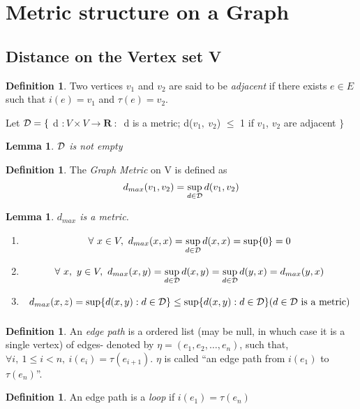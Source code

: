 \documentclass[a4paper,10pt]{book}
\newtheorem{lemma}[theorem]{Lemma}
\theoremstyle{definition}
\newtheorem{definition}[theorem]{Definition}
\theoremstyle{remark}
\numberwithin{section}{chapter}
\numberwithin{equation}{chapter}
\begin{document}
   \section{ Metric structure on a Graph}
   
   \subsection{Distance on the Vertex set V}
   \begin{definition}
      Two vertices $ v_{1}$ and $v_{2} $ are said to be \emph{adjacent} if there exists $ e \in E $ such that $ i(e) = v_1 $ and $ \tau (e) = v_2 $.
   \end{definition}
   Let $ \cal{D} = \{ $ d $: V \times V \rightarrow \mathbf{R} \ : \ $ 
 d is a metric; d($ v_1,\ v_2 $) $ \leq $ 1 if $ v_1 $, $ v_2 $ are adjacent $ \} $
   \begin{lemma}
      $ \cal{D} $ is not empty
   \end{lemma}
   \begin{definition}
      The \emph{Graph Metric} on V is defined as
      \begin{equation}
	  d_{max}(v_1,v_2)= \sup_{d \in \cal{D} }d(v_1,v_2) \nonumber
      \end{equation} 
   \end{definition}
   \begin{lemma}
	$ d_{max} $ is a metric.
    \proof 
    \begin{enumerate}
      \item \[\forall \ x \in V,\ d_{max}(x, x)= \sup_{d \in \cal{D}}d(x,x) = \sup\{ 0 \} = 0 \]
      \item \[\forall \ x,\ y \in V,\ d_{max}(x, y)= \sup_{d \in \cal{D} }d(x,y)= \sup_{d \in \cal{D} }d(y,x)  =d _{max}(y, x) \]
      \item \[ d_{max}(x, z)=\sup\{d(x,y): d \in \mathcal{D}\} \leq \sup_{}\{ d(x,y): d \in \mathcal{D}\} {( d \in \cal{D} \text{ is a metric})} \]
    \end{enumerate}    
  \end{lemma}
  \begin{definition}
   An \emph{edge path} is a ordered list (may be null, in whuch case it is a single vertex) of edges- denoted by $ \eta=(e_1,e_2,\dots,e_n) $, such that, $ \forall i,\ 1\leq i < n,\ i(e_i)=\tau(e_{i+1})$. $\eta$ is called ``an edge path from $i(e_1)$ to $\tau(e_n)$''.
  \end{definition}
  \begin{definition}
   An edge path is a \emph{loop} if $i(e_1) = \tau(e_n)$ 
  \end{definition}
\end{document}
